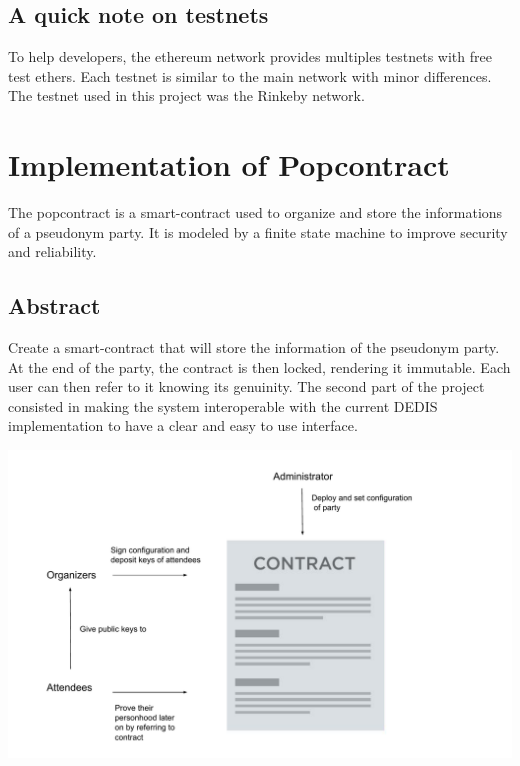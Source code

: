 \documentclass[11pt, a4paper, twoside, openright]{book} %
\begin{document}
\subsection{A quick note on testnets}
To help developers, the ethereum network provides multiples testnets with free test ethers. Each testnet is similar to the main network with minor differences. The testnet used in this project was the Rinkeby network.


\newpage



\section{Implementation of Popcontract}
The popcontract is a smart-contract used to organize and store the informations of a pseudonym party. It is modeled by a finite state machine to improve security and reliability.
\subsection{Abstract}
Create a smart-contract that will store the information of the pseudonym party. At the end of the party, the contract is then locked, rendering it immutable. Each user can then refer to it knowing its genuinity.
The second part of the project consisted in making the system interoperable with the current DEDIS implementation to have a clear and easy to use interface.



\begin{minipage}{1\linewidth}
 \includegraphics[scale = 0.67]{popcontract.pdf}
\end{minipage}%
\end{document}

